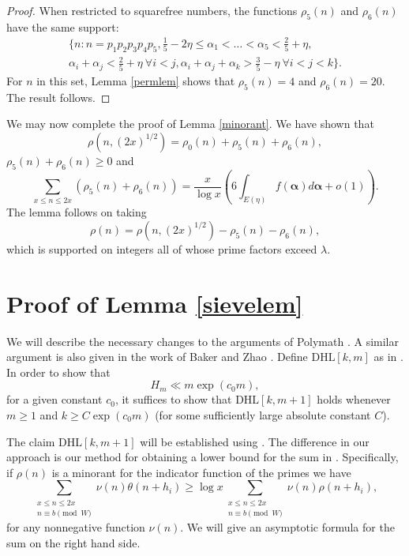 \documentclass[12pt]{amsart}
\theoremstyle{plain}
\theoremstyle{definition}
\newcommand{\bs}{\boldsymbol}
\numberwithin{equation}{section}
\def \a{\alpha} \def \b{\beta} \def \d{\delta} \def \e{\varepsilon} \def \g{\gamma} \def \k{\kappa} \def \l{\lambda} \def \s{\sigma} \def \t{\theta} \def \z{\zeta}
\newcommand{\twosum}[2]{\sum_{\substack{#1\\#2}}}
\begin{document}
\begin{proof}
When restricted to squarefree numbers, the functions $\rho_5(n)$ and $\rho_6(n)$ have the same support:
\begin{equation*}
\begin{split}
\{n:n=p_1p_2p_3p_4p_5,\frac15-2\eta\leq \a_1<\ldots<\a_5<\frac25+\eta,\\
\a_i+\a_j<\frac25+\eta\ \forall i<j,\a_i+\a_j+\a_k>\frac35-\eta\ \forall i<j<k\}.
\end{split}
\end{equation*}
For $n$ in this set, Lemma \ref{permlem} shows that $\rho_5(n)=4$ and $\rho_6(n)=20$.  The result follows.  
\end{proof}

We may now complete the proof of Lemma \ref{minorant}.  We have shown that 
$$\rho(n,(2x)^{1/2})=\rho_0(n)+\rho_5(n)+\rho_6(n),$$
$\rho_5(n)+\rho_6(n)\geq 0$ and 
$$\sum_{x\leq n\leq 2x}(\rho_5(n)+\rho_6(n))=\frac{x}{\log x}\left(6\int_{E(\eta)} f(\bs \a)d\bs \a+o(1)\right).$$
The lemma follows on taking 
$$\rho(n)=\rho(n,(2x)^{1/2})-\rho_5(n)-\rho_6(n),$$
which is supported on integers all of whose prime factors exceed $\l$.  

\section{Proof of Lemma \ref{sievelem}}

We will describe the necessary changes to the arguments of Polymath \cite{polymath8b}.  A similar argument is also given in the work of Baker and Zhao \cite{bakerz}.  Define $\mathrm{DHL}[k,m]$ as in \cite[Claim 3.1]{polymath8b}.  In order to show that 
 $$H_m\ll m\exp(c_0m),$$
for a given constant $c_0$, it suffices to show that $\mathrm{DHL}[k,m+1]$ holds whenever $m\geq 1$ and $k\geq C\exp(c_0m)$ (for some sufficiently large absolute constant $C$).  

The claim $\mathrm{DHL}[k,m+1]$ will be established using \cite[Lemma 3.4]{polymath8b}.  The difference in our approach is our method for obtaining a lower bound for the sum in \cite[(14)]{polymath8b}.  Specifically, if $\rho(n)$ is a minorant for the indicator function of the primes we have 
$$\twosum{x\leq n\leq 2x}{n\equiv b\pmod W}\nu(n)\theta(n+h_i)\geq \log x\twosum{x\leq n\leq 2x}{n\equiv b\pmod W}\nu(n)\rho(n+h_i),$$
for any nonnegative function $\nu(n)$.  We will give an asymptotic formula for the sum on the right hand side.
\end{document}
